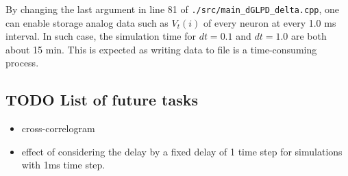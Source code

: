 \documentclass[11pt]{scrartcl}
\begin{document}
By changing the last argument in line 81 of \texttt{./src/main\_dGLPD\_delta.cpp}, one can enable storage analog data such as \(V_t(i)\) of every neuron at every 1.0 ms interval. In such case, the simulation time for \(dt=0.1\) and \(dt=1.0\) are both about 15 min. This is expected as writing data to file is a time-consuming process.

\subsection{{\bfseries\sffamily TODO} List of future tasks}
\label{sec:org0071579}

\begin{itemize}
\item cross-correlogram
\item effect of considering the delay by a fixed delay of 1 time step for simulations with 1ms time step.
\end{itemize}


\end{document}
